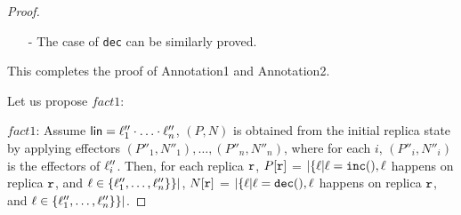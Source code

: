 \begin {proof}
\begin{itemize}
    By the causal delivery assumption, for each operation $\alabel''$, such that $\alabel''$ is visible to $\alabel$, we can see that, the effector of $\alabel''$ has already been applied in $S'$, and it is easy to see that the effector of $\alabel''$ has already been applied in $S$. It is easy to see that $\alabel'' \in \alabelset$. By Annotation1 of the effector $(P_{\alabel},N_{\alabel})$ and Annotation2 of the local configuration $Lc$, we can see that, for each replica $\arep' \neq \arep_{\alabel}$, we have $P_{\alabel}[\arep'] \leq P[\arep']$ and $N_{\alabel}[\arep'] \leq N[\arep']$.

    By the causal delivery assumption, for each operation $\alabel'$, such that $\alabel$ is visible to $\alabel'$, we can see that, the effector of $\alabel'$ has not been applied in $S'$ yet, and it is easy to see that the effector of $\alabel'$ has not been applied in $S$ yet. It is easy to see that $\alabel' \notin \alabelset$. Especially, this holds for operations happen on replica $\arep_{\alabel}$. Also, note that, the effector of $\alabel$ has not been applied in $S$ yet. It is easy to see that $\alabel \notin \alabelset$. By Annotation1 of the effector $(P_{\alabel},N_{\alabel})$ and Annotation2 of the local configuration $Lc$, we can see that, $P_{\alabel}[\arep_{\alabel}] = P[\arep_{\alabel}]+1$, $N_{\alabel}[\arep_{\alabel}] = N[\arep_{\alabel}]$.

    Therefore, we can see that $P' = P[\arep_{\alabel}: P[\arep_{\alabel}]+1]$ and $N' = N$. Thus, Annotation2 for the local configuration $Lc'$ holds.

\item[-] The case of {\tt dec} can be similarly proved.
\end{itemize}

This completes the proof of Annotation1 and Annotation2.



Let us propose $fact1$:

$fact1$: Assume $\alinord = \alabel''_1 \cdot \ldots \cdot \alabel''_n$, $(P,N)$ is obtained from the initial replica state by applying effectors $(P''_1,N''_1),\ldots,(P''_n,N''_n)$, where for each $i$, $(P''_i,N''_i)$ is the effectors of $\alabel''_i$. Then, for each replica $\arep$, $P[\arep]$ =  $\vert \{ \alabel \vert \alabel = \alabelshort[{\tt inc}]{}, \alabel$ happens on replica $\arep$, and $\alabel \in \{ \alabel''_1,\ldots,\alabel''_n \} \} \vert$, $N[\arep]$ =  $\vert \{ \alabel \vert \alabel = \alabelshort[{\tt dec}]{}, \alabel$ happens on replica $\arep$, and $\alabel \in \{ \alabel''_1,\ldots,\alabel''_n \} \} \vert$.



\end{proof}
